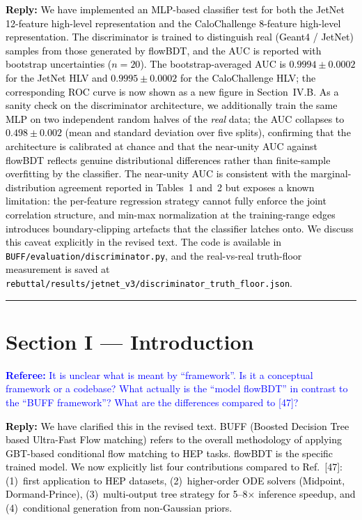 \documentclass[11pt]{article}
\newcommand{\refcomment}[1]{\textcolor{blue}{\textbf{Referee:} #1}}
\newcommand{\reply}[1]{\textcolor{black}{\textbf{Reply:} #1}}
\begin{document}
\reply{We have implemented an MLP-based classifier test for both the JetNet 12-feature high-level representation and the CaloChallenge 8-feature high-level representation. The discriminator is trained to distinguish real (Geant4 / JetNet) samples from those generated by flowBDT, and the AUC is reported with bootstrap uncertainties ($n=20$). The bootstrap-averaged AUC is $0.9994 \pm 0.0002$ for the JetNet HLV and $0.9995 \pm 0.0002$ for the CaloChallenge HLV; the corresponding ROC curve is now shown as a new figure in Section~IV.B. As a sanity check on the discriminator architecture, we additionally train the same MLP on two independent random halves of the \emph{real} data; the AUC collapses to $0.498 \pm 0.002$ (mean and standard deviation over five splits), confirming that the architecture is calibrated at chance and that the near-unity AUC against flowBDT reflects genuine distributional differences rather than finite-sample overfitting by the classifier. The near-unity AUC is consistent with the marginal-distribution agreement reported in Tables~1 and~2 but exposes a known limitation: the per-feature regression strategy cannot fully enforce the joint correlation structure, and min-max normalization at the training-range edges introduces boundary-clipping artefacts that the classifier latches onto. We discuss this caveat explicitly in the revised text. The code is available in \texttt{BUFF/evaluation/discriminator.py}, and the real-vs-real truth-floor measurement is saved at \texttt{rebuttal/results/jetnet\_v3/discriminator\_truth\_floor.json}.}

\bigskip
\hrule
\bigskip

\section*{Section I --- Introduction}

\refcomment{It is unclear what is meant by ``framework''. Is it a conceptual framework or a codebase? What actually is the ``model flowBDT'' in contrast to the ``BUFF framework''? What are the differences compared to [47]?}

\reply{We have clarified this in the revised text. BUFF (Boosted Decision Tree based Ultra-Fast Flow matching) refers to the overall methodology of applying GBT-based conditional flow matching to HEP tasks. flowBDT is the specific trained model. We now explicitly list four contributions compared to Ref.~[47]: (1)~first application to HEP datasets, (2)~higher-order ODE solvers (Midpoint, Dormand-Prince), (3)~multi-output tree strategy for 5--8$\times$ inference speedup, and (4)~conditional generation from non-Gaussian priors.}
\end{document}
